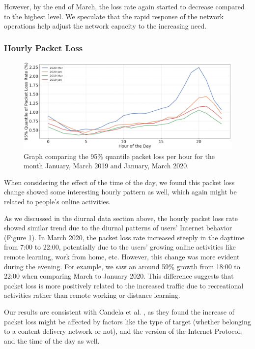 However, by the end of March, the loss rate again started to decrease compared to the highest level. We speculate that the rapid response of the network operations help adjust the network capacity to the increasing need.

\subsubsection{Hourly Packet Loss}

\begin{figure}[ht]
\centering
\includegraphics[width=1.0\linewidth]{figs/packet_loss_per_hour.png}
\caption{Graph comparing the 95\% quantile packet loss per hour for the month January, March 2019 and January, March 2020.}
\label{fig:packetlossperhour}
\end{figure}


When considering the effect of the time of the day, we found this packet loss change showed some interesting hourly pattern as well, which again might be related to people's online activities.

As we discussed in the diurnal data section above, the hourly packet loss rate showed similar trend due to the diurnal patterns of users’ Internet behavior (Figure \ref{fig:packetlossperhour}). In March 2020, the packet loss rate increased steeply in the daytime from 7:00 to 22:00, potentially due to the users' growing online activities like remote learning, work from home, etc. However, this change was more evident during the evening. For example, we saw an around 59\% growth from 18:00 to 22:00 when comparing March to January 2020. This difference suggests that packet loss is more positively related to the increased traffic due to recreational activities rather than remote working or distance learning. 


Our results are consistent with Candela et al. \cite{Candela2020latency}, as they found the increase of packet loss might be affected by factors like the type of target (whether belonging to a content delivery network or not), and the version of the Internet Protocol, and the time of the day as well.




